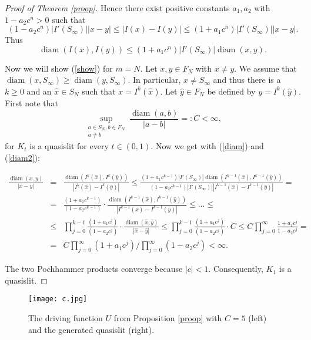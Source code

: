 \documentclass[11pt]{amsart}
\numberwithin{equation}{section}
\theoremstyle{plain}
\theoremstyle{definition}
\begin{document}
\begin{proof}[Proof of Theorem \ref{proop}]
Hence there exist positive constants $a_1,a_2$ with $1-a_2c^n>0$ such that
\begin{equation}\label{diam}(1-a_2c^n)|I'(S_\infty)||x-y|\leq|I(x)-I(y)|\leq(1+a_1c^n)|I'(S_\infty)||x-y|.\end{equation} Thus \begin{equation}\label{diam2}{\operatorname{diam}}(I(x),I(y))\leq (1+a_1c^n)|I'(S_\infty)|{\operatorname{diam}}(x,y).\end{equation}
 
Now we will show (\ref{show}) for $m=N.$ Let $x, y \in F_N$ with $x\not=y.$ We assume that ${\operatorname{diam}}(x,S_\infty)\geq {\operatorname{diam}}(y,S_\infty).$ In particular, $x\not=S_\infty$ and thus there is a $k\geq 0$ and an $\hat{x}\in S_N$ such that $x=I^k(\hat{x}).$ Let $\hat{y}\in F_N$ be defined by $y=I^k(\hat{y}).$ 
First note that
$$ \sup_{
\substack{a\in S_N, b\in F_N \\ a\not=b}} \frac{{\operatorname{diam}}(a,b)}{|a-b|}=:C<\infty,
$$
for $K_t$ is a quasislit for every $t\in(0,1).$ Now we get with (\ref{diam}) and (\ref{diam2}):

\begin{eqnarray*}
 \frac{{\operatorname{diam}}(x,y)}{|x-y|} &=&  \frac{{\operatorname{diam}}(I^k(\hat{x}),I^k(\hat{y}))}{|I^k(\hat{x})-I^k(\hat{y})|}\leq \frac{(1+a_1c^{k-1})|I'(S_\infty)|{\operatorname{diam}}(I^{k-1}(\hat{x}),I^{k-1}(\hat{y}))}{(1-a_2c^{k-1})|I'(S_\infty)||I^{k-1}(\hat{x})-I^{k-1}(\hat{y})|} =\\
&=& \frac{(1+a_1c^{k-1})}{(1-a_2c^{k-1})}\cdot \frac{{\operatorname{diam}}(I^{k-1}(\hat{x}),I^{k-1}(\hat{y}))}{|I^{k-1}(\hat{x})-I^{k-1}(\hat{y})|} \leq ... \leq \\
&\leq& \prod \limits_{j=0}^{k-1} \frac{(1+a_1c^j)}{(1-a_2c^j)}\cdot \frac{{\operatorname{diam}}(\hat{x},\hat{y})}{|\hat{x}-\hat{y}|}  \leq
 \prod \limits_{j=0}^{k-1} \frac{(1+a_1c^j)}{(1-a_2c^j)} \cdot C \leq   C \prod  \limits_{j=0}^{\infty}\frac{1+a_1c^j}{1-a_2c^j} =\\ &=&
 C  \prod \limits_{j=0}^{\infty}(1+a_1c^j) / \prod \limits_{j=0}^{\infty}(1-a_2c^j)   <\infty.
\end{eqnarray*}

The two Pochhammer products converge because $|c|<1.$ Consequently, $K_1$ is a quasislit.
\end{proof}

  \begin{figure}[h]
    \centering
\texttt{[image: c.jpg]}
 \caption{The driving function $U$ from Proposition \ref{proop} with $C=5$ (left) and the generated quasislit (right).}
 \end{figure}
\end{document}
